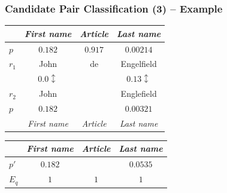 \documentclass[12pt]{beamer}
\theoremstyle{break}
\begin{document}


\begin{frame}
	\frametitle{Candidate Pair Classification (3) -- Example}

	\begin{center}

        \begin{tabular}{| l | c | c | c |}
            \cline{2-4}
            \multicolumn{1}{l|}{ } & \textit{First name} & \textit{Article} & \textit{Last name} \\\hline
            $p$ & $0.182$ & $0.917$ & $0.00214$ \\\hline
            $r_1$ & John & de & Engelfield \\\hline
            \multicolumn{1}{c}{ } & \multicolumn{1}{c}{$0.0 \updownarrow$} & \multicolumn{1}{c}{ } & \multicolumn{1}{c}{$0.13 \updownarrow$} \\\hline
            $r_2$ & John & & Englefield \\\hline
            $p$ & $0.182$ &  & $0.00321$\\\hline
            \multicolumn{1}{l|}{ } & \textit{First name} & \textit{Article} & \textit{Last name}\\\cline{2-4}
        \end{tabular}
	        
	    \bigskip
	    
        \begin{tabular}{| l | c | c | c |}
            \cline{2-4}
            \multicolumn{1}{l|}{ } & \textit{First name} & \textit{Article} & \textit{Last name} \\\hline
            $p'$ & $0.182$ & & $0.0535$ \\\hline
            $E_q$ & $1$ & $1$ & $1$\\\hline
        \end{tabular}
       
     \end{center}
	
\end{frame}


\end{document}
